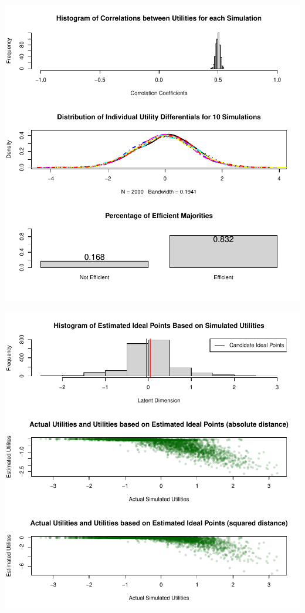 \documentclass[12pt]{article}\usepackage[]{graphicx}\usepackage[]{color}
\makeatletter
\def\maxwidth{ %
  \ifdim\Gin@nat@width>\linewidth
    \linewidth
  \else
    \Gin@nat@width
  \fi
}
\newenvironment{knitrout}{}{} %
\makeatother
\begin{document}
\begin{knitrout}
\color{fgcolor}
\includegraphics[width=\maxwidth]{figure/unnamed-chunk-81} 

\includegraphics[width=\maxwidth]{figure/unnamed-chunk-82} 

\end{knitrout}
\end{document}
